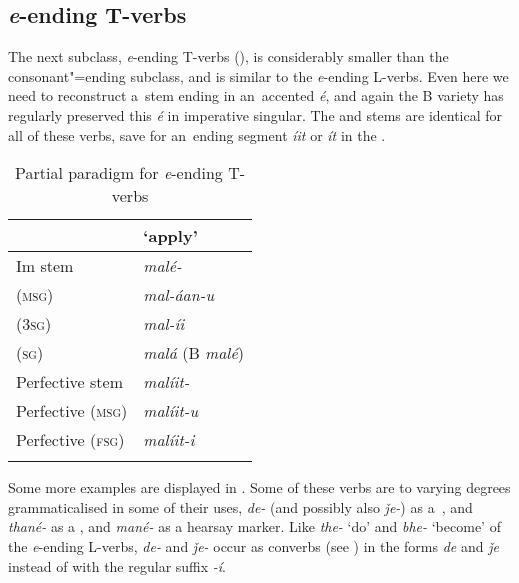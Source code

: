 \subsection{\textit{e}-ending T-verbs}
\label{subsec:8-3-6}


The next subclass, \textit{e}-ending T-verbs (), is considerably smaller than the consonant"=ending subclass, and is similar to the \textit{e}-ending L-verbs. Even here we need to reconstruct a~stem ending in an~accented \textit{é}, and again the B variety has regularly preserved this \textit{é} in imperative singular. The  and  stems are identical for all of these verbs, save for an~ending segment \textit{íit} or \textit{ít} in the .


\begin{table}[h]
\caption{Partial paradigm for \textit{e}-ending T-verbs}
\begin{tabularx}{.75\textwidth}{ Q Q }
\lsptoprule
&
`apply'\\\midrule
Im stem &
\textit{malé-}\\
 (\textsc{msg}) &
\textit{mal-áan-u} \\
 (\textsc{3sg}) &
\textit{mal-íi} \\
 (\textsc{sg}) &
\textit{malá} (B \textit{malé})\\
Perfective stem &
\textit{malíit-} \\
Perfective (\textsc{msg}) &
\textit{malíit-u} \\
Perfective (\textsc{fsg}) &
\textit{malíit-i} \\\lspbottomrule
\end{tabularx}
\label{tab:8-9}
\end{table}


Some more examples are displayed in . Some of these verbs are to varying degrees grammaticalised in some of their uses, \textit{de-} (and possibly also \textit{ǰe-}) as a~, and \textit{thané-} as a , and \textit{mané-} as a hearsay marker. Like \textit{the-} `do' and \textit{bhe-} `become' of the \textit{e}-ending L-verbs, \textit{de-} and \textit{ǰe-} occur as converbs (see ) in the forms \textit{de} and \textit{ǰe} instead of with the regular suffix \textit{-í}.


